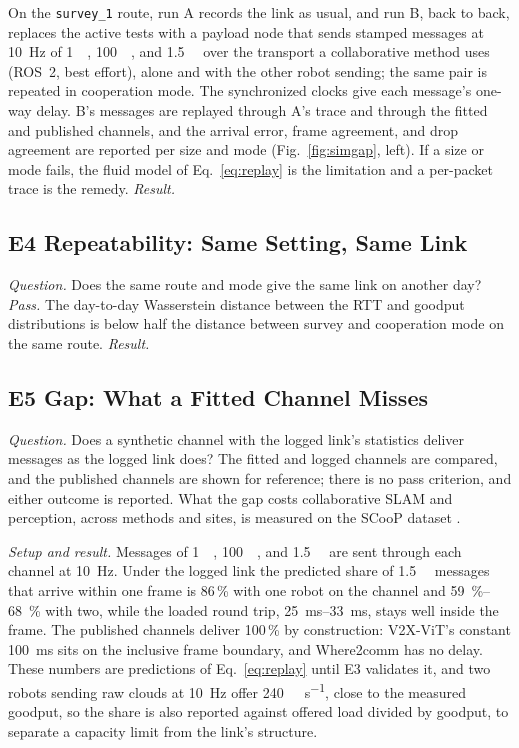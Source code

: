 On the \texttt{survey\_1} route, run A records the link as usual, and
run B, back to back, replaces the active tests with a payload node that
sends stamped messages at \SI{10}{\hertz} of \SI{1}{\kilo\byte},
\SI{100}{\kilo\byte}, and \SI{1.5}{\mega\byte} over the transport a
collaborative method uses (ROS~2, best effort), alone and with the other
robot sending; the same pair is repeated in cooperation mode. The
synchronized clocks give each message's one-way delay. B's messages are
replayed through A's trace and through the fitted and published
channels, and the arrival error, frame agreement, and drop agreement are
reported per size and mode (Fig.~\ref{fig:simgap}, left). If a size or
mode fails, the fluid model of Eq.~\eqref{eq:replay} is the limitation
and a per-packet trace \cite{nemfi} is the remedy. \emph{Result.}

\subsection{E4 Repeatability: Same Setting, Same Link}
\emph{Question.} Does the same route and mode give the same link on
another day? \emph{Pass.} The day-to-day Wasserstein distance between
the RTT and goodput distributions is below half the distance between
survey and cooperation mode on the same route. \emph{Result.}

\subsection{E5 Gap: What a Fitted Channel Misses}
\emph{Question.} Does a synthetic channel with the logged link's
statistics deliver messages as the logged link does? The fitted and
logged channels are compared, and the published channels are shown for
reference; there is no pass criterion, and either outcome is reported.
What the gap costs collaborative SLAM and perception, across methods
and sites, is measured on the SCooP dataset \cite{scoop_dataset}.

\emph{Setup and result.} Messages of \SI{1}{\kilo\byte}, \SI{100}{\kilo\byte},
and \SI{1.5}{\mega\byte} are sent through each channel at \SI{10}{\hertz}.
Under the logged link the predicted share of \SI{1.5}{\mega\byte} messages
that arrive within one frame is 86\,\% with one robot on the channel and
\SIrange{59}{68}{\percent} with two, while the loaded round trip,
\SIrange{25}{33}{\milli\second}, stays well inside the frame. The published
channels deliver 100\,\% by construction: V2X-ViT's constant
\SI{100}{\milli\second} sits on the inclusive frame boundary, and
Where2comm has no delay. These numbers are predictions of
Eq.~\eqref{eq:replay} until E3 validates it, and two robots sending raw
clouds at \SI{10}{\hertz} offer \SI{240}{\mega\bit\per\second}, close to the
measured goodput, so the share is also reported against offered load
divided by goodput, to separate a capacity limit from the link's
structure. 

